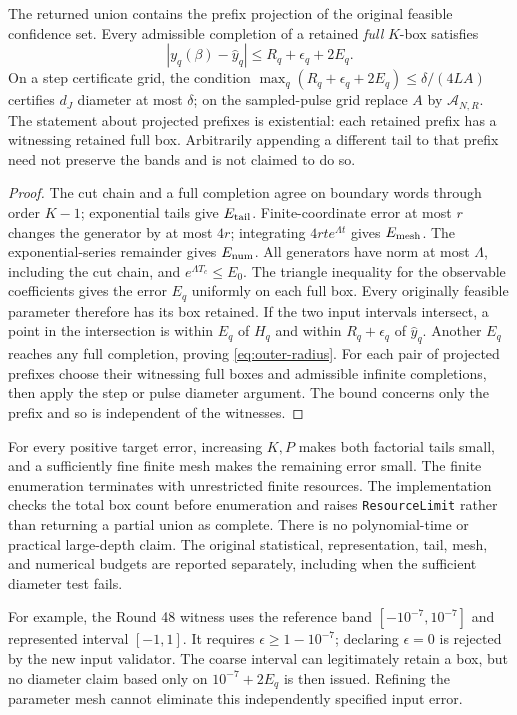 \begin{theorem}
\label{thm:outer}
The returned union contains the prefix projection of the original feasible
confidence set. Every admissible completion of a retained \emph{full} $K$-box
satisfies
\begin{equation}
 |y_q(\beta)-\widehat y_q|\le R_q+\epsilon_q+2E_q.
 \label{eq:outer-radius}
\end{equation}
On a step certificate grid, the condition
$\max_q(R_q+\epsilon_q+2E_q)\le\delta/(4LA)$ certifies $d_J$ diameter at most
$\delta$; on the sampled-pulse grid replace $A$ by $\mathcal A_{N,R}$.
The statement about projected prefixes is existential: each retained prefix
has a witnessing retained full box. Arbitrarily appending a different tail
to that prefix need not preserve the bands and is not claimed to do so.
\end{theorem}
\begin{proof}
The cut chain and a full completion agree on boundary words through order
$K-1$; exponential tails give $E_{\rm tail}$. Finite-coordinate error at most
$r$ changes the generator by at most $4r$; integrating
$4rt e^{\Lambda t}$ gives $E_{\rm mesh}$. The exponential-series remainder
gives $E_{\rm num}$. All generators have norm at most $\Lambda$, including the
cut chain, and $e^{\Lambda T_c}\le E_0$. The triangle inequality for the
observable coefficients gives the error $E_q$ uniformly on each full box.
Every originally feasible parameter therefore has its box retained.
If the two input intervals intersect, a point in the intersection is within
$E_q$ of $H_q$ and within $R_q+\epsilon_q$ of $\widehat y_q$. Another $E_q$
reaches any full completion, proving \eqref{eq:outer-radius}.
For each pair of projected prefixes choose their witnessing full boxes and
admissible infinite completions, then apply the step or pulse diameter argument.
The bound concerns only the prefix and so is independent of the witnesses.
\end{proof}

For every positive target error, increasing $K,P$ makes both factorial tails
small, and a sufficiently fine finite mesh makes the remaining error small.
The finite enumeration terminates with unrestricted finite resources. The
implementation checks the total box count before enumeration and raises
\texttt{ResourceLimit} rather than returning a partial union as complete.
There is no polynomial-time or practical large-depth claim. The original
statistical, representation, tail, mesh, and numerical budgets are reported
separately, including when the sufficient diameter test fails.

For example, the Round 48 witness uses the reference band
$[-10^{-7},10^{-7}]$ and represented interval $[-1,1]$. It requires
$\epsilon\ge1-10^{-7}$; declaring $\epsilon=0$ is rejected by the new input
validator. The coarse interval can legitimately retain a box, but no diameter
claim based only on $10^{-7}+2E_q$ is then issued. Refining the parameter mesh
cannot eliminate this independently specified input error.
